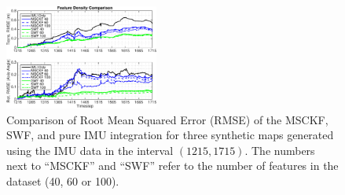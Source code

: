 \documentclass[letterpaper, 10 pt, conference]{ieeeconf}  %
\begin{document}
\begin{figure}
    \centering
    \includegraphics[width=0.45\textwidth]{figs/RMSE-Comparison-Feat-Density-1215-1715-Noisy}

    \caption{Comparison of Root Mean Squared Error (RMSE) of the MSCKF, SWF, and pure IMU integration for three synthetic maps generated using the IMU data in the interval $(1215,1715)$. The numbers next to ``MSCKF'' and ``SWF'' refer to the number of features in the dataset (40, 60 or 100).}
    \label{fig:comp_3}
    \vspace{-0.2cm}
\end{figure}
\end{document}
